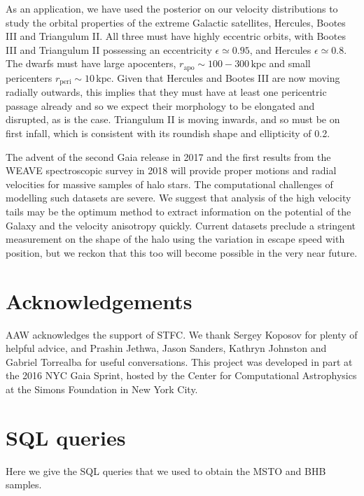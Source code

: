 \documentclass[useAMS,twocolumn,usenatbib]{mn2e}
\def\kpc{{\,\mathrm{kpc}}}
\def\rp{{r_\mathrm{peri}}}
\def\ra{{r_\mathrm{apo}}}
\begin{document}
As an application, we have used the posterior on our velocity
distributions to study the orbital properties of the extreme Galactic
satellites, Hercules, Bootes III and Triangulum II. All three must
have highly eccentric orbits, with Bootes III and Triangulum II
possessing an eccentricity $\epsilon \simeq 0.95$, and Hercules
$\epsilon \simeq 0.8$. The dwarfs must have large apocenters, $\ra
\sim 100 - 300\kpc$ and small pericenters $\rp \sim 10\kpc$. Given
that Hercules and Bootes III are now moving radially outwards, this
implies that they must have at least one pericentric passage already
and so we expect their morphology to be elongated and disrupted, as is
the case. Triangulum II is moving inwards, and so must be on first
infall, which is consistent with its roundish shape and ellipticity of
0.2.

The advent of the second Gaia release in 2017 and the first results
from the WEAVE spectroscopic survey in 2018 will provide proper
motions and radial velocities for massive samples of halo stars. The
computational challenges of modelling such datasets are severe. We
suggest that analysis of the high velocity tails may be the optimum
method to extract information on the potential of the Galaxy and the
velocity anisotropy quickly.  Current datasets preclude a stringent
measurement on the shape of the halo using the variation in escape
speed with position, but we reckon that this too will become possible
in the very near future.

\section*{Acknowledgements}

AAW acknowledges the support of STFC. We thank Sergey Koposov for
plenty of helpful advice, and Prashin Jethwa, Jason Sanders, Kathryn
Johnston and Gabriel Torrealba for useful conversations.  This project
was developed in part at the 2016 NYC Gaia Sprint, hosted by the
Center for Computational Astrophysics at the Simons Foundation in New
York City.




\appendix

\section{SQL queries}
\label{sec:sql}

Here we give the {\sc SQL} queries that we used to obtain the MSTO and BHB samples.
\end{document}
